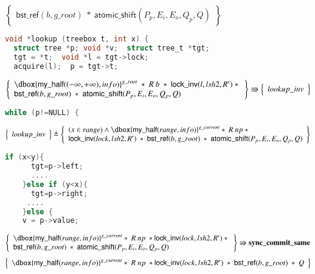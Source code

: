 \documentclass[runningheads]{llncs}
\newcommand\dboxed[1]{\dbox{\ensuremath{#1}}}
\newcommand{\ghost}[2]{\ensuremath{\dboxed{#1}^{#2}}}
\newcommand{\nodeboxrep}{\ensuremath{\mathsf{bst\_ref}}}
\begin{document}
{\begin{figure}[htp]
\begin{subfigure}[t]{1\textwidth}
 $$\left\{\begin{array}{l} \nodeboxrep(b,g\_root)\ *\ \mathsf{atomic\_shift}(P_p,E_i,E_o,Q_p,Q)\end{array}\right\}$$
\begin{lstlisting}[language = C,  numbers = none]
void *lookup (treebox t, int x) {
  struct tree *p; void *v;  struct tree_t *tgt;
  tgt = *t;  void *l = tgt->lock;
  acquire(l);  p = tgt->t;
 \end{lstlisting}  
 $$\left\{\begin{array}{l} \ghost{\mathsf{my\_half}((-\infty,+\infty),info)}{g\_root}\ *\ R\ b\ *\ \mathsf{lock\_inv}(l,lsh2,R')\ *\ \\
 \nodeboxrep(b,g\_root)\ *\ \mathsf{atomic\_shift}(P_p,E_i,E_o,Q_p,Q)\end{array}\right\} \Rrightarrow \left\{\begin{array}{l} lookup\_inv \end{array}\right\}$$ 
  \begin{lstlisting}[language = C, numbers = none]
    while (p!=NULL) {
       \end{lstlisting}   
   $$\left\{\begin{array}{l} lookup\_inv \end{array}\right\} \triangleq \left\{\begin{array}{l}(x\in range)\land \ghost{\mathsf{my\_half}(range,info)}{g\_current}*\ R\ np\ *\\\mathsf{lock\_inv}(lock,lsh2,R')\ *\ \nodeboxrep(b,g\_root)\ *\ \mathsf{atomic\_shift}(P_p,E_i,E_o,Q_p,Q)\end{array}\right\}$$
      \begin{lstlisting}[language = C,  numbers = none]
    if (x<y){
      tgt=p->left;
      ....
    }else if (y<x){
      tgt=p->right;
     ....
    }else {
    v = p->value;
           \end{lstlisting} 
  $$\left\{\begin{array}{l} \ghost{\mathsf{my\_half}(range,info)}{g\_current}*\ R\ np\ *\mathsf{lock\_inv}(lock,lsh2,R')\ *\ \\\nodeboxrep(b,g\_root)\ *\ \mathsf{atomic\_shift}(P_p,E_i,E_o,Q_p,Q)\end{array}\right\} \Rrightarrow{\textbf{sync\_commit\_same}}$$
$$\left\{\begin{array}{l} \ghost{\mathsf{my\_half}(range,info)}{g\_current}*\ R\ np\ *\mathsf{lock\_inv}(lock,lsh2,R')\ *\ \nodeboxrep(b,g\_root)\ *\ Q\end{array}\right\}$$

\end{subfigure}
\end{figure}}
\end{document}
